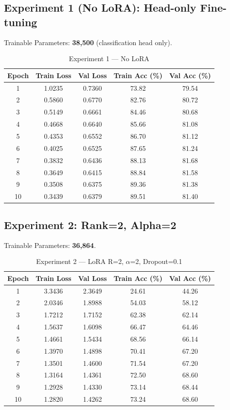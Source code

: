 \documentclass[12pt,a4paper]{article}
\begin{document}
\subsection{Experiment 1 (No LoRA): Head-only Fine-tuning}
Trainable Parameters: \textbf{38,500} (classification head only).

\begin{table}[H]
\centering
\caption{Experiment 1 --- No LoRA}
\small
\begin{tabular}{ccccc}
\toprule
Epoch & Train Loss & Val Loss & Train Acc (\%) & Val Acc (\%) \\
\midrule
1  & 1.0235 & 0.7360 & 73.82 & 79.54 \\
2  & 0.5860 & 0.6770 & 82.76 & 80.72 \\
3  & 0.5149 & 0.6661 & 84.46 & 80.68 \\
4  & 0.4668 & 0.6640 & 85.66 & 81.08 \\
5  & 0.4353 & 0.6552 & 86.70 & 81.12 \\
6  & 0.4025 & 0.6525 & 87.65 & 81.24 \\
7  & 0.3832 & 0.6436 & 88.13 & 81.68 \\
8  & 0.3649 & 0.6415 & 88.84 & 81.58 \\
9  & 0.3508 & 0.6375 & 89.36 & 81.38 \\
10 & 0.3439 & 0.6379 & 89.51 & 81.40 \\
\bottomrule
\end{tabular}
\end{table}

\subsection{Experiment 2: Rank=2, Alpha=2}
Trainable Parameters: \textbf{36,864}.

\begin{table}[H]
\centering
\caption{Experiment 2 --- LoRA R=2, $\alpha$=2, Dropout=0.1}
\small
\begin{tabular}{ccccc}
\toprule
Epoch & Train Loss & Val Loss & Train Acc (\%) & Val Acc (\%) \\
\midrule
1  & 3.3436 & 2.3649 & 24.61 & 44.26 \\
2  & 2.0346 & 1.8988 & 54.03 & 58.12 \\
3  & 1.7212 & 1.7152 & 62.38 & 62.14 \\
4  & 1.5637 & 1.6098 & 66.47 & 64.46 \\
5  & 1.4661 & 1.5434 & 68.56 & 66.14 \\
6  & 1.3970 & 1.4898 & 70.41 & 67.20 \\
7  & 1.3501 & 1.4600 & 71.54 & 67.20 \\
8  & 1.3164 & 1.4361 & 72.50 & 68.60 \\
9  & 1.2928 & 1.4330 & 73.14 & 68.44 \\
10 & 1.2820 & 1.4262 & 73.24 & 68.60 \\
\bottomrule
\end{tabular}
\end{table}
\end{document}
